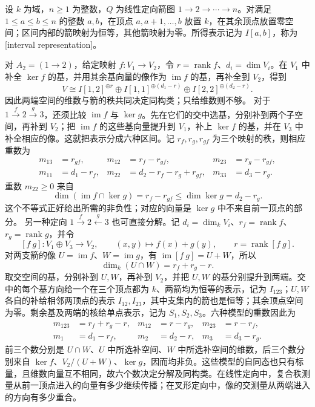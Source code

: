 \begin{definition}\label{b5:def:interval-quiver-representation}
	设 \(k\) 为域，\(n\ge1\) 为整数，\(Q\) 为线性定向箭图 \(1\to2\to\cdots\to n\)。对满足 \(1\le a\le b\le n\) 的整数 \(a,b\)，在顶点 \(a,a+1,\ldots,b\) 放置 \(k\)，在其余顶点放置零空间；区间内部的箭映射为恒等，其他箭映射为零。所得表示记为 \(I[a,b]\)，称为[interval representation]。
\end{definition}
对 \(A_2=(1\to2)\)，给定映射 \(f:V_1\to V_2\)，令 \(r=\operatorname{rank}f\)、\(d_i=\dim V_i\)。在 \(V_1\) 中补全 \(\ker f\) 的基，并用其余基向量的像作为 \(\operatorname{im}f\) 的基，再补全到 \(V_2\)，得到
\[
	V\cong I[1,2]^{\oplus r}\oplus I[1,1]^{\oplus(d_1-r)} \oplus I[2,2]^{\oplus(d_2-r)}.
\]
因此两端空间的维数与箭的秩共同决定同构类；只给维数则不够。
\ProseParagraphBreak
对于 \(1\xrightarrow{f}2\xrightarrow{g}3\)，还须比较 \(\operatorname{im}f\) 与 \(\ker g\)。先在它们的交中选基，分别补到两个子空间，再补到 \(V_2\)；把 \(\operatorname{im}f\) 的这些基向量提升到 \(V_1\)，补上 \(\ker f\) 的基，并在 \(V_3\) 中补全相应的像。这就把表示分成六种区间。记 \(r_f,r_g,r_{gf}\) 为三个映射的秩，则相应重数为
\[
	\begin{aligned}
		m_{13}&=r_{gf},&m_{12}&=r_f-r_{gf},&m_{23}&=r_g-r_{gf},\\
		m_{11}&=d_1-r_f,&m_{22}&=d_2-r_f-r_g+r_{gf},& m_{33}&=d_3-r_g.
	\end{aligned}
\]
重数 \(m_{22}\ge0\) 来自
\[
	\dim(\operatorname{im}f\cap\ker g)=r_f-r_{gf} \le\dim\ker g=d_2-r_g.
\]
这个不等式正好给出所需的非负性；对应的向量是 \(\ker g\) 中不来自前一顶点的部分。
\ProseParagraphBreak
另一种定向 \(1\xrightarrow{f}2\xleftarrow{g}3\) 也可直接分解。记 \(d_i=\dim_kV_i\)、\(r_f=\operatorname{rank}f\)、\(r_g=\operatorname{rank}g\)，并令
\[
	[f\ g]:V_1\oplus V_3\longrightarrow V_2,\qquad (x,y)\longmapsto f(x)+g(y),\qquad r=\operatorname{rank}[f\ g].
\]
对两支箭的像 \(U=\operatorname{im}f\)、\(W=\operatorname{im}g\)，有 \(\operatorname{im}[f\ g]=U+W\)，所以
\[
	\dim_k(U\cap W)=r_f+r_g-r.
\]
取交空间的基，分别补到 \(U,W\)，再补到 \(V_2\)，并把 \(U,W\) 的基分别提升到两端。交中的每个基方向给一个在三个顶点都为 \(k\)、两箭均为恒等的表示，记为 \(I_{123}\)；\(U,W\) 各自的补给相邻两顶点的表示 \(I_{12},I_{23}\)，其中支集内的箭也是恒等；其余顶点空间为零。剩余基及两端的核给单点表示，记为 \(S_1,S_2,S_3\)。六种模型的重数因此为
\[
	\begin{aligned}
		m_{123}&=r_f+r_g-r,&m_{12}&=r-r_g,&m_{23}&=r-r_f,\\
		m_1&=d_1-r_f,&m_2&=d_2-r,&m_3&=d_3-r_g.
	\end{aligned}
\]
前三个数分别是 \(U\cap W\)、\(U\) 中所选补空间、\(W\) 中所选补空间的维数，后三个数分别来自 \(\ker f\)、\(V_2/(U+W)\)、\(\ker g\)，因而均非负。这些模型的自同态也只有标量，且维数向量互不相同，故六个数决定分解及同构类。在线性定向中，复合秩测量从前一顶点进入的向量有多少继续传播；在叉形定向中，像的交测量从两端进入的方向有多少重合。

